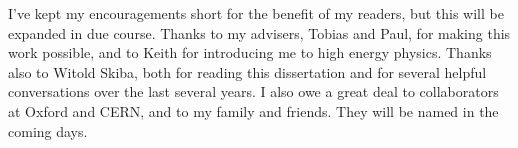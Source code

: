 I've kept my encouragements short for the benefit of my readers, but this will be expanded in due course.
Thanks to my advisers, Tobias and Paul, for making this work possible, and to Keith for introducing me to high energy physics.
Thanks also to Witold Skiba, both for reading this dissertation and for several helpful conversations over the last several years.
I also owe a great deal to collaborators at Oxford and CERN, and to my family and friends. They will be named in the coming days.
